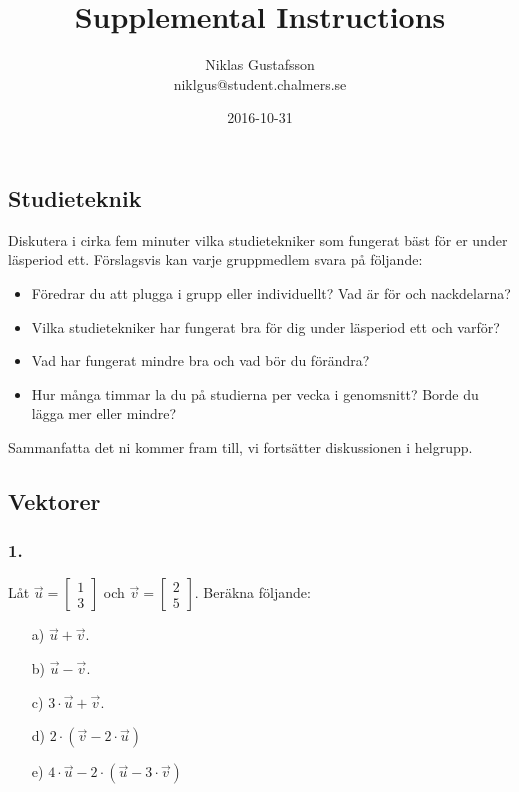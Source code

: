 \documentclass{article}
\title{Supplemental Instructions}
\author{Niklas Gustafsson \\ 
		\small{niklgus@student.chalmers.se}
}
\date{
      2016-10-31
     }
\begin{document}
\maketitle

\subsection*{Studieteknik}
Diskutera i cirka fem minuter vilka studietekniker som fungerat bäst för er under läsperiod ett. Förslagsvis kan varje gruppmedlem svara på följande:
\begin{itemize}
\item Föredrar du att plugga i grupp eller individuellt? Vad är för och nackdelarna?
\item Vilka studietekniker har fungerat bra för dig under läsperiod ett och varför?
\item Vad har fungerat mindre bra och vad bör du förändra?
\item Hur många timmar la du på studierna per vecka i genomsnitt? Borde du lägga mer eller mindre?
\end{itemize}

\noindent
Sammanfatta det ni kommer fram till, vi fortsätter diskussionen i helgrupp. 

\subsection*{Vektorer}

\subsubsection*{1.}
Låt $\vec{u} = \begin{bmatrix} 1 \\ 3 \end{bmatrix}$ och $\vec{v} = \begin{bmatrix} 2 \\ 5 \end{bmatrix}$. Beräkna följande:
\begin{itemize}
\item[a) ] $\vec{u} + \vec{v}$.
\item[b) ] $\vec{u} - \vec{v}$.
\item[c) ] $3 \cdot \vec{u} + \vec{v}$.
\item[d) ] $2 \cdot(\vec{v} - 2 \cdot \vec{u})$
\item[e) ] $4 \cdot \vec{u} -2 \cdot (\vec{u} -3 \cdot \vec{v})$
\end{itemize} 
\end{document}
